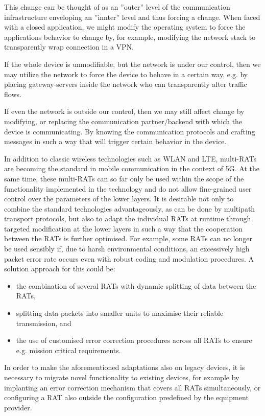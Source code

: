 This change can be thought of as an ''outer'' level of the communication infrastructure enveloping an ''innter'' level and thus forcing a change.
When faced with a closed application, we might modify the operating system to force the applications behavior to change by, for example, modifying the network stack to transparently wrap connection in a VPN.

If the whole device is unmodifiable, but the network is under our control, then we may utilize the network  to force the device to behave in a certain way, e.g. by placing gateway-servers inside  the network who can transparently alter traffic flows.

If even the network is outside our control, then we may still affect change by modifying, or replacing the communication partner/backend with which the device is communicating.
By knowing the communication protocols and crafting messages in such a way that will trigger certain behavior in the device.

In addition to classic wireless technologies such as WLAN and LTE, multi-RATs are becoming the standard in mobile communication in the context of 5G. 
At the same time, these multi-RATs can so far only be used within the scope of the functionality implemented in the technology and do not allow fine-grained user control over the parameters of the lower layers.
It is desirable not only to combine the standard technologies advantageously, as can be done by multipath transport protocols, but also to adapt the individual RATs at runtime through targeted modification at the lower layers in such a way that the cooperation between the RATs is further optimised. 
For example, some RATs can no longer be used sensibly if, due to harsh environmental conditions, an excessively high packet error rate occurs even with robust coding and modulation procedures. A solution approach for this could be:
\begin{itemize}
\item the combination of several RATs with dynamic splitting of data between the RATs,
\item splitting data packets into smaller units to maximise their reliable transmission, and 
\item the use of customised error correction procedures across all RATs to ensure e.g. mission critical requirements.
\end{itemize}

In order to make the aforementioned adaptations also on legacy devices, it is necessary to migrate novel functionality to existing devices, for example by implanting an error correction mechanism that covers all RATs simultaneously, or configuring a RAT also outside the configuration predefined by the equipment provider. 

